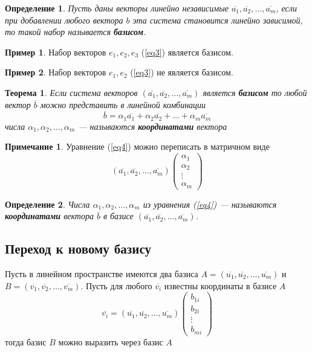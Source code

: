 \documentclass[]{article}
\theoremstyle{theorem}
\newtheorem{thr}{Теорема}
\newtheorem{dfn}{Определение}
\theoremstyle{definition}
\newtheorem{ex}{Пример}
\newtheorem*{nt}{Примечание}
\begin{document}
\begin{dfn}
	Пусть даны векторы линейно независимые $\overline{a_1},\overline{a_2},\ldots, \overline{a_m}$, если при добавлении любого вектора $b$ эта система становится линейно зависимой, то такой набор называется \textbf{базисом}.
\end{dfn} 

\begin{ex}
	Набор векторов $e_1,e_2,e_3$ (\ref{eq3}) является базисом.
\end{ex}

\begin{ex}
	Набор векторов $e_1,e_2$ (\ref{eq3}) не является базисом.
\end{ex}

\begin{thr}
	Если система векторов $(\overline{a_1},\overline{a_2},\ldots, \overline{a_m})$ является \textbf{базисом} то любой вектор $\overline{b}$ можно представить в линейной комбинации
	\begin{equation}\label{eq4}
		\overline{b}=\alpha_1\overline{a_1}+\alpha_2\overline{a_2}+\ldots+ \alpha_m\overline{a_m}
	\end{equation}
	числа $\alpha_1,\alpha_2,\ldots,\alpha_m$ --- называются \textbf{координатами} вектора  
\end{thr}

\begin{nt}
	Уравнение (\ref{eq4}) можно переписать в матричном виде
\begin{equation}
	(\overline{a_1},\overline{a_2},\ldots, \overline{a_m})
	\begin{pmatrix}
		\alpha_1
		\\
		\alpha_2
		\\
		\vdots
		\\
		\alpha_m
	\end{pmatrix}
\end{equation}
\end{nt}

\begin{dfn}
	Числа $\alpha_1,\alpha_2,\ldots,\alpha_m$ из уравнения (\ref{eq4}) --- называются \textbf{координатами} вектора $\overline{b}$ в базисе $(\overline{a_1},\overline{a_2},\ldots, \overline{a_m})$.
\end{dfn}
\subsection{Переход к новому базису}
Пусть в линейном пространстве имеются два базиса $A=(\overline{u_1},\overline{u_2},\ldots, \overline{u_m})$ и $B=(\overline{v_1},\overline{v_2},\ldots, \overline{v_m})$. Пусть для любого $\overline{v_i}$ известны координаты в базисе $A$
\begin{equation*}
	\overline{v_i}=(\overline{u_1},\overline{u_2},\ldots, \overline{u_m})
	\begin{pmatrix}
		b_{1i}
		\\
		b_{2i}
		\\
		\vdots
		\\
		b_{mi}
	\end{pmatrix}
\end{equation*}
тогда базис $B$ можно выразить через базис $A$
\end{document}
